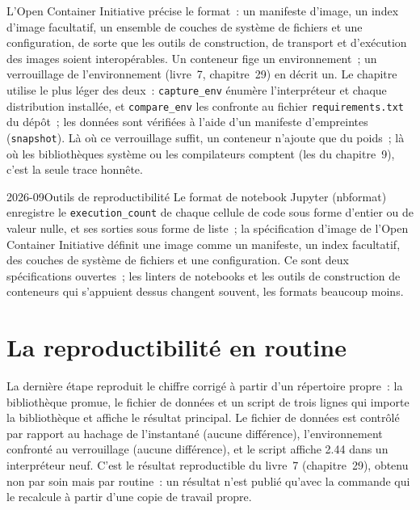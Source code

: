 L'Open Container Initiative précise le format~: un manifeste d'image, un index d'image facultatif, un ensemble de couches de système de fichiers et une
configuration, de sorte que les outils de construction, de transport et d'exécution des images soient interopérables. Un conteneur fige un environnement~; un
verrouillage de l'environnement (livre~7, chapitre~29) en décrit un. Le chapitre utilise le plus léger des deux~: \texttt{capture\_env} énumère l'interpréteur et chaque
distribution installée, et \texttt{compare\_env} les confronte au fichier \texttt{requirements.txt} du dépôt~; les données sont vérifiées
à l'aide d'un manifeste d'empreintes (\texttt{snapshot}). Là où ce verrouillage suffit, un conteneur n'ajoute que du poids~; là où les bibliothèques système ou
les compilateurs comptent (les  du chapitre~9), c'est la seule trace honnête.

\begin{dated}{2026-09}{Outils de reproductibilité}\label{dat:pl:the-research-environment:tools}
Le format de notebook Jupyter (nbformat) enregistre le \texttt{execution\_count} de chaque cellule de code sous forme d'entier ou de valeur nulle, et ses sorties sous forme de liste~;
la spécification d'image de l'Open Container Initiative définit une image comme un manifeste, un index facultatif, des couches de système de fichiers et une
configuration. Ce sont deux spécifications ouvertes~; les linters de notebooks et les outils de construction de conteneurs qui s'appuient dessus changent souvent, les formats beaucoup moins.
\end{dated}

\section{La reproductibilité en routine}

La dernière étape reproduit le chiffre corrigé à partir d'un répertoire propre~: la bibliothèque promue, le fichier de données et un script de trois lignes qui
importe la bibliothèque et affiche le résultat principal. Le fichier de données est contrôlé par rapport au hachage de l'instantané (aucune différence), l'environnement
confronté au verrouillage (aucune différence), et le script affiche 2.44 dans un interpréteur neuf. C'est le résultat reproductible du livre~7 (chapitre~29), obtenu
non par soin mais par routine~: un résultat n'est publié qu'avec la commande qui le recalcule à partir d'une copie de travail propre.

